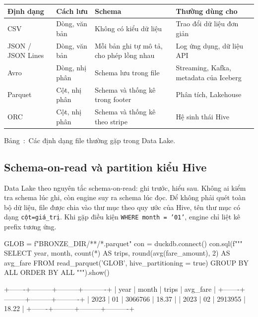 \documentclass[12pt]{article}
\newenvironment{figblock}{\par\medskip\noindent\begin{minipage}{\linewidth}}{\end{minipage}\par\medskip}
\newcounter{bang}
\newcommand{\tabcap}[2]{%
  \begin{captionbelowboxaivn}\refstepcounter{bang}Bảng~\thebang:~#1\label{#2}\end{captionbelowboxaivn}}
\begin{document}
\begin{figblock}\begin{center}
\renewcommand{\arraystretch}{1.3}
\begin{tabularx}{\linewidth}{|P{2.6cm}|P{2.4cm}|L|L|}
\hline
{}
\textbf{Định dạng} & \textbf{Cách lưu} & \textbf{Schema} & \textbf{Thường dùng cho} \\
\hline
CSV & Dòng, văn bản & Không có kiểu dữ liệu & Trao đổi dữ liệu đơn giản \\
\hline
JSON / JSON Lines & Dòng, văn bản & Mỗi bản ghi tự mô tả, cho phép lồng nhau & Log ứng dụng, dữ liệu API \\
\hline
Avro & Dòng, nhị phân & Schema lưu trong file & Streaming, Kafka, metadata của Iceberg \\
\hline
Parquet & Cột, nhị phân & Schema và thống kê trong footer & Phân tích, Lakehouse \\
\hline
ORC & Cột, nhị phân & Schema và thống kê theo stripe & Hệ sinh thái Hive \\
\hline
\end{tabularx}
\end{center}
\tabcap{Các định dạng file thường gặp trong Data Lake.}{tab:formats}
\end{figblock}

\subsection{Schema-on-read và partition kiểu Hive}

Data Lake theo nguyên tắc schema-on-read: ghi trước, hiểu sau. Không ai kiểm tra schema lúc ghi, còn engine suy ra schema lúc đọc. Để không phải quét toàn bộ dữ liệu, file được chia vào thư mục theo quy ước của Hive, tên thư mục có dạng \texttt{cột=giá\_trị}. Khi gặp điều kiện \texttt{WHERE month = '01'}, engine chỉ liệt kê prefix tương ứng.

\begin{aivncodebox}
\begin{python}
GLOB = f"{BRONZE_DIR}/**/*.parquet"
con = duckdb.connect()
con.sql(f"""
    SELECT year, month, count(*) AS trips, round(avg(fare_amount), 2) AS avg_fare
    FROM read_parquet('{GLOB}', hive_partitioning = true)
    GROUP BY ALL ORDER BY ALL
""").show()
\end{python}
\end{aivncodebox}

\begin{aivnCodeOutput}[Output]
\begin{python}
+-------+---------+---------+----------+
| year  |  month  |  trips  | avg_fare |
+-------+---------+---------+----------+
|  2023 | 01      | 3066766 |    18.37 |
|  2023 | 02      | 2913955 |    18.22 |
+-------+---------+---------+----------+
\end{python}
\end{aivnCodeOutput}
\end{document}
